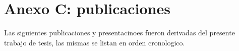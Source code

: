 \cleardoublepage{}
{}
\FormatoAnexoC

\RemoveLabelsAxDos

\AddLabelsAxTres

\let\originalstyle=\thispagestyle            %
\def\thispagestyle#1{\fancyfoot[C]{}}       %
\def\thispagestyle#1{\originalstyle{empty}} %
\def\thispagestyle#1{}                       %

\chapter*{Anexo C: publicaciones}

  \noindent Las siguientes publicaciones y presentacinoes fueron derivadas del presente trabajo de tesis, las mismas se listan en orden cronologico.

